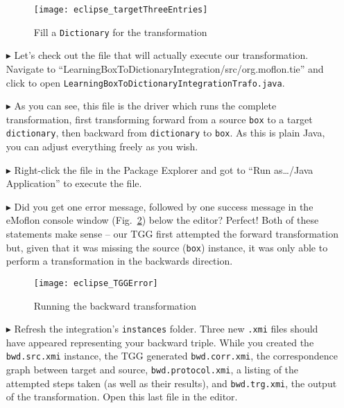 \begin{itemize}
\begin{figure}[htbp]
\begin{center}
  \texttt{[image: eclipse\_targetThreeEntries]}
  \caption{Fill a \texttt{Dictionary} for the transformation}
  \label{eclipse:dictionaryxmi}
\end{center}
\end{figure}

\item[$\blacktriangleright$] Let's check out the file that will actually execute our transformation. Navigate to
``LearningBox\-To\-Dictionary\-In\-te\-gra\-tion\-/\-src/\-org.\-mof\-lon.\-tie'' and click to open
\texttt{Learn\-ing\-Box\-To\-Dict\-ion\-ary\-Int\-e\-grat\-ion\-Trafo.\-java}.

\item[$\blacktriangleright$] As you can see, this file is the driver which runs the complete transformation, first transforming forward from a source
\texttt{box} to a target \texttt{dictionary}, then backward from \texttt{dictionary} to \texttt{box}. As this is plain Java, you can adjust everything freely as
you wish.

\item[$\blacktriangleright$] Right-click the file in the Package Explorer and got to ``Run as\ldots/Java Application'' to execute the file.

\item[$\blacktriangleright$] Did you get one error message, followed by one success message in the eMoflon console window (Fig.~\ref{eclipse:tggERROR}) below
the editor? Perfect! Both of these statements make sense -- our TGG first attempted the forward transformation but, given that it was missing the source
(\texttt{box}) instance, it was only able to perform a transformation in the backwards direction.

\vspace{0.5cm}

\begin{figure}[htbp]
\begin{center}
  \texttt{[image: eclipse\_TGGError]}
  \caption{Running the backward transformation}
  \label{eclipse:tggERROR}
\end{center}
\end{figure}

\vspace{-0.5cm}

\item[$\blacktriangleright$] Refresh the integration's \texttt{instances} folder. Three new \texttt{.xmi} files should have appeared representing your backward
triple. While you created the \texttt{bwd.src.xmi} instance, the TGG generated \texttt{bwd.corr.xmi}, the correspondence graph between target and source,
\texttt{bwd.protocol.xmi}, a listing of the attempted steps taken (as well as their results), and \texttt{bwd.trg.xmi}, the output of the transformation. Open
this last file in the editor.


\end{itemize}
